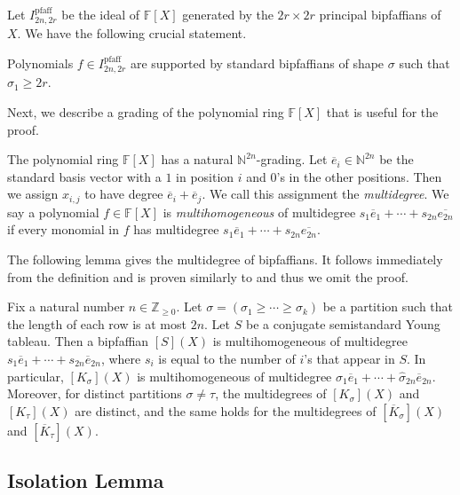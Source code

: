 \documentclass[10pt,a4paper]{amsart}
\DeclareMathOperator{\pfaff}{pfaff}
\newcommand*\N{\mathbb{N}}
\newcommand*\Z{\mathbb{Z}}
\newcommand*\F{\mathbb{F}}
\begin{document}
Let $I^{\pfaff}_{2n, 2r}$ be the ideal of $\F[X]$ generated by the $2r \times 2r$ principal bipfaffians of $X$.
We have the following crucial statement.
\begin{prop}[{\cite[\S 5]{HT92}}]\label{prop:pfaff_shape}
    Polynomials $f \in I^{\pfaff}_{2n, 2r}$ are supported by standard bipfaffians of shape $\sigma$ such that $\sigma_1 \geq 2r$.
\end{prop}

Next, we describe a grading of the polynomial ring $\F[X]$ that is useful for the proof.

\begin{defn}\label{defn:multideg_pfaff}
    The polynomial ring $\F[X]$ has a natural $\N^{2n}$-grading.
    Let $\overline{e}_i \in \N^{2n}$ be the standard basis vector with a $1$ in position $i$ and $0$'s in the other positions.
    Then we assign $x_{i, j}$ to have degree $\overline{e}_i + \overline{e}_j$.
    We call this assignment the \emph{multidegree}.
    We say a polynomial $f \in \F[X]$ is \emph{multihomogeneous} of multidegree $s_1 \overline{e}_1 + \cdots + s_{2n} \overline{e_{2n}}$ if every monomial in $f$ has multidegree $s_1 \overline{e}_1 + \cdots + s_{2n} \overline{e_{2n}}$.
\end{defn} 

The following lemma gives the multidegree of bipfaffians.
It follows immediately from the definition and is proven similarly to  and thus we omit the proof.
\begin{lem}\label{lem:canonical_degs_bifpaffian}
    Fix a natural number $n \in \Z_{\geq 0}$.
    Let $\sigma = (\sigma_1 \geq \cdots \geq \sigma_k)$ be a partition such that the length of each row is at most $2n$.
    Let $S$ be a conjugate semistandard Young tableau.
    Then a bipfaffian $[S](X)$ is multihomogeneous of multidegree $s_1 \overline{e}_1 + \cdots + s_{2n} \overline{e}_{2n}$, where $s_i$ is equal to the number of $i$'s that appear in $S$.
    In particular, $[K_\sigma](X)$ is multihomogeneous of multidegree $\widehat{\sigma}_1 \overline{e}_1 + \cdots + \widehat{\sigma}_{2n} \overline{e}_{2n}$.
    Moreover, for distinct partitions $\sigma \neq \tau$, the multidegrees of $[K_\sigma](X)$ and $[K_\tau](X)$ are distinct, and the same holds for the multidegrees of $[\overline{K}_\sigma](X)$ and $[\overline{K}_\tau](X)$.
\end{lem}

\subsection{Isolation Lemma}
\end{document}
